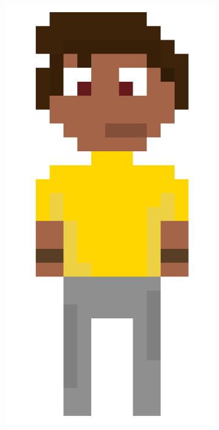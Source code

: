 \begin{figure}[htbp]
    \centering
    \caption{\small Melhores resultados do CGDream utilizando a funcionalidade de imagem}
    \label{fig:cgDreamMelhorImagem}
    \begin{subfigure}{0.21\linewidth}
        \includegraphics[width=1\linewidth]{figs/sprites/Pablo.PNG}

\end{subfigure}
\end{figure}
